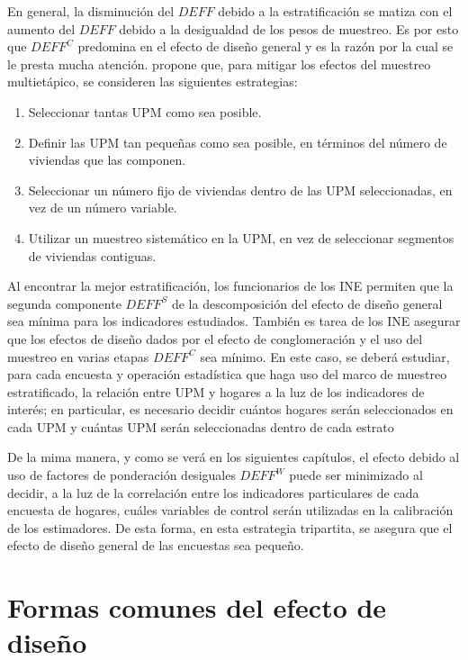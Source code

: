 \documentclass[
  12pt,
]{book}
\providecommand{\tightlist}{%
  \setlength{\itemsep}{0pt}\setlength{\parskip}{0pt}}
\begin{document}
En general, la disminución del \(DEFF\) debido a la estratificación se matiza con el aumento del \(DEFF\) debido a la desigualdad de los pesos de muestreo. Es por esto que \(DEFF^C\) predomina en el efecto de diseño general y es la razón por la cual se le presta mucha atención. \citet{United_Nations_2008} propone que, para mitigar los efectos del muestreo multietápico, se consideren las siguientes estrategias:

\begin{enumerate}
\def\labelenumi{\arabic{enumi}.}
\tightlist
\item
  Seleccionar tantas UPM como sea posible.
\item
  Definir las UPM tan pequeñas como sea posible, en términos del número de viviendas que las componen.
\item
  Seleccionar un número fijo de viviendas dentro de las UPM seleccionadas, en vez de un número variable.
\item
  Utilizar un muestreo sistemático en la UPM, en vez de seleccionar segmentos de viviendas contiguas.
\end{enumerate}

Al encontrar la mejor estratificación, los funcionarios de los INE permiten que la segunda componente \(DEFF^S\) de la descomposición del efecto de diseño general sea mínima para los indicadores estudiados. También es tarea de los INE asegurar que los efectos de diseño dados por el efecto de conglomeración y el uso del muestreo en varias etapas \(DEFF^C\) sea mínimo. En este caso, se deberá estudiar, para cada encuesta y operación estadística que haga uso del marco de muestreo estratificado, la relación entre UPM y hogares a la luz de los indicadores de interés; en particular, es necesario decidir cuántos hogares serán seleccionados en cada UPM y cuántas UPM serán seleccionadas dentro de cada estrato

De la mima manera, y como se verá en los siguientes capítulos, el efecto debido al uso de factores de ponderación desiguales \(DEFF^W\) puede ser minimizado al decidir, a la luz de la correlación entre los indicadores particulares de cada encuesta de hogares, cuáles variables de control serán utilizadas en la calibración de los estimadores. De esta forma, en esta estrategia tripartita, se asegura que el efecto de diseño general de las encuestas sea pequeño.

\hypertarget{formas-comunes-del-efecto-de-diseuxf1o}{%
\section{Formas comunes del efecto de diseño}\label{formas-comunes-del-efecto-de-diseuxf1o}}
\end{document}
